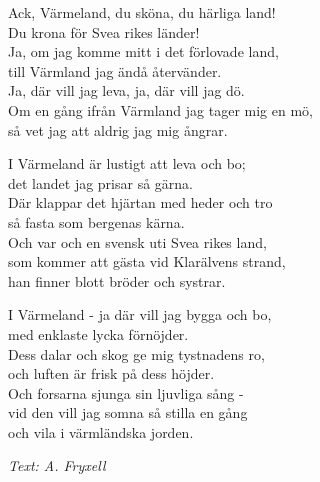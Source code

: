 \vspace{10pt}
Ack, Värmeland, du sköna, du härliga land!\\
Du krona för Svea rikes länder!\\
Ja, om jag komme mitt i det förlovade land,\\
till Värmland jag ändå återvänder.\\
Ja, där vill jag leva, ja, där vill jag dö.\\
Om en gång ifrån Värmland jag tager mig en mö,\\
så vet jag att aldrig jag mig ångrar.\par
\vspace{10pt}
I Värmeland är lustigt att leva och bo;\\
det landet jag prisar så gärna.\\
Där klappar det hjärtan med heder och tro\\
så fasta som bergenas kärna.\\
Och var och en svensk uti Svea rikes land,\\
som kommer att gästa vid Klarälvens strand,\\
han finner blott bröder och systrar.\par
\vspace{10pt}
I Värmeland - ja där vill jag bygga och bo,\\
med enklaste lycka förnöjder.\\
Dess dalar och skog ge mig tystnadens ro,\\
och luften är frisk på dess höjder.\\
Och forsarna sjunga sin ljuvliga sång -\\
vid den vill jag somna så stilla en gång\\
och vila i värmländska jorden.\par
\vspace{10pt}
{\footnotesize\textit{Text: A. Fryxell}}
